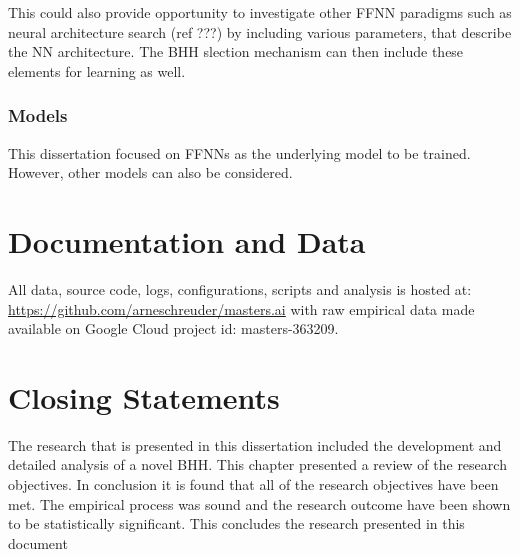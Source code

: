 This could also provide opportunity to investigate other \ac{FFNN} paradigms such as neural architecture search (ref ???) by including various parameters, that describe the \ac{NN} architecture. The \ac{BHH} slection mechanism can then include these elements for learning as well.

\subsubsection{Models}

This dissertation focused on \acp{FFNN} as the underlying model to be trained. However, other models can also be considered.


\section{Documentation and Data}
\label{sec:conclusion:documentation_and_data}

All data, source code, logs, configurations, scripts and analysis is hosted at: \url{https://github.com/arneschreuder/masters.ai} with raw empirical data made available on Google Cloud project id: masters-363209.


\section{Closing Statements}
\label{sec:conclusion:closing_statements}

The research that is presented in this dissertation included the development and detailed analysis of a novel \ac{BHH}. This chapter presented a review of the research objectives. In conclusion it is found that all of the research objectives have been met. The empirical process was sound and the research outcome have been shown to be statistically significant. This concludes the research presented in this document
